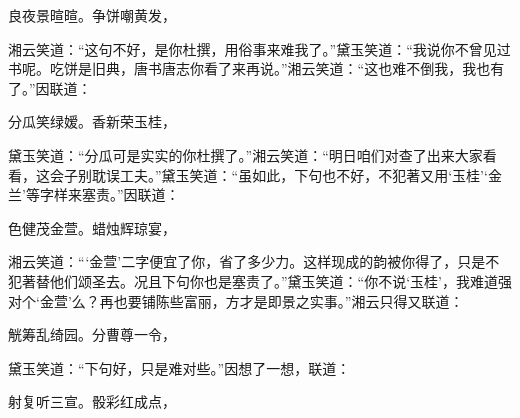 \begin{poem}
    \begin{pl}
        良夜景暄暄。争饼嘲黄发，
    \end{pl}
\end{poem}


\begin{parag}
    湘云笑道：“这句不好，是你杜撰，用俗事来难我了。”黛玉笑道：“我说你不曾见过书呢。吃饼是旧典，唐书唐志你看了来再说。”湘云笑道：“这也难不倒我，我也有了。”因联道：
\end{parag}


\begin{poem}
    \begin{pl}
        分瓜笑绿嫒。香新荣玉桂，
    \end{pl}
\end{poem}


\begin{parag}
    黛玉笑道：“分瓜可是实实的你杜撰了。”湘云笑道：“明日咱们对查了出来大家看看，这会子别耽误工夫。”黛玉笑道：“虽如此，下句也不好，不犯著又用‘玉桂’‘金兰’等字样来塞责。”因联道：
\end{parag}


\begin{poem}
    \begin{pl}
        色健茂金萱。蜡烛辉琼宴，
    \end{pl}
\end{poem}


\begin{parag}
    湘云笑道：“‘金萱’二字便宜了你，省了多少力。这样现成的韵被你得了，只是不犯著替他们颂圣去。况且下句你也是塞责了。”黛玉笑道：“你不说‘玉桂’，我难道强对个‘金萱’么？再也要铺陈些富丽，方才是即景之实事。”湘云只得又联道：
\end{parag}


\begin{poem}
    \begin{pl}
        觥筹乱绮园。分曹尊一令，
    \end{pl}
\end{poem}


\begin{parag}
    黛玉笑道：“下句好，只是难对些。”因想了一想，联道：
\end{parag}
\begin{poem}
    \begin{pl}
        射复听三宣。骰彩红成点，

    \end{pl}
\end{poem}


